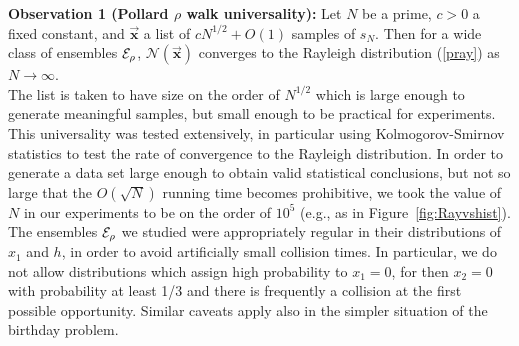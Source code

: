 \documentclass{llncs}
\numberwithin{equation}{section}
\renewcommand\({\left(}
\renewcommand\){\right)}
\begin{document}
\noindent
{\bf Observation 1 (Pollard $\rho$ walk universality):} Let $N$ be a prime, $c>0$ a  fixed constant, and $\overrightarrow{\mathbf x}$ a list of $cN^{1/2}+O(1)$ samples of  $s_{N}$.  Then for a wide class of ensembles $\cal E_\rho$, ${\mathcal N}(\overrightarrow{\mathbf x})$ converges to the Rayleigh distribution (\ref{pray})  as $N\rightarrow \infty$.\\



\noindent
The list is taken to have size on the order of $N^{1/2}$ which is large enough to generate meaningful samples, but small enough to be practical for experiments.
This universality was tested extensively, in particular using Kolmogorov-Smirnov statistics to test the rate of convergence to the Rayleigh distribution.
In order to generate a data set large enough to obtain valid statistical conclusions, but not so large that the  $O(\sqrt{N})$ running time becomes prohibitive, we took
 the value of $N$ in our experiments to be on the order of $10^5$ (e.g., as in Figure~\ref{fig:Rayvshist}).
 The ensembles $\cal E_\rho$ we studied were appropriately regular in their distributions of $x_1$ and $h$, in order to avoid artificially small collision times.  In particular, we do not allow distributions which assign high probability to $x_1=0$, for then $x_2=0$ with probability at least 1/3 and   there is frequently a collision at the first possible opportunity. Similar caveats apply also in the simpler situation of the birthday problem.\\


\end{document}
